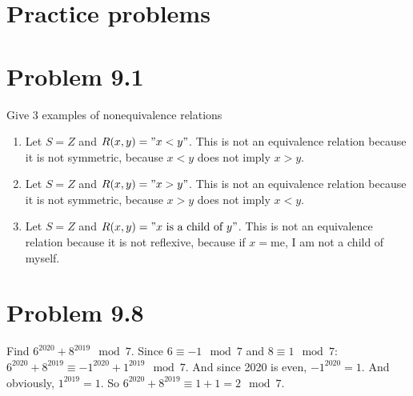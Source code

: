 \documentclass[12pt]{article}
\title{\scalebox{2}{Math 341 Homework 9}}
\author{\scalebox{1.5}{Theo Koss}}
\date{October 2020}
\begin{document}
\maketitle
\section{Practice problems}
\section{Problem 9.1}
Give 3 examples of nonequivalence relations
\begin{enumerate}
    \item Let $S=Z$ and $R(x,y)="x<y"$. This is not an equivalence relation because it is not symmetric, because $x<y$ does not imply $x>y$.
    \item Let $S=Z$ and $R(x,y)="x>y"$. This is not an equivalence relation because it is not symmetric, because $x>y$ does not imply $x<y$.
    \item Let $S=Z$ and $R(x,y)="x\text{ is a child of }y"$. This is not an equivalence relation because it is not reflexive, because if $x=\text{me}$, I am not a child of myself.
\end{enumerate}
\section{Problem 9.8}
Find $6^{2020}+8^{2019}\mod{7}$.
\newline Since $6\equiv-1\mod{7}$ and $8\equiv1\mod{7}$: $6^{2020}+8^{2019}\equiv-1^{2020}+1^{2019}\mod{7}$. And since 2020 is even, $-1^{2020}=1$. And obviously, $1^{2019}=1$. So $6^{2020}+8^{2019}\equiv1+1=2\mod{7}$.
\end{document}
